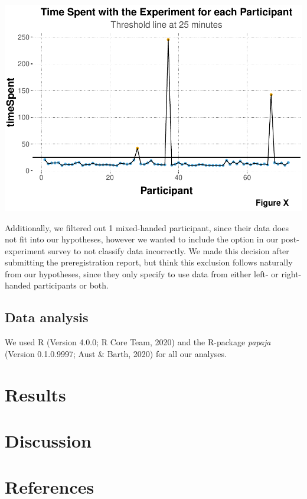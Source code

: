 \documentclass[
  english,
  man,floatsintext]{apa6}
\begin{document}
\includegraphics{APA_Template_files/figure-latex/unnamed-chunk-4-1.pdf}

Additionally, we filtered out 1 mixed-handed participant, since their data does not fit into our hypotheses, however we wanted to include the option in our post-experiment survey to not classify data incorrectly. We made this decision after submitting the preregistration report, but think this exclusion follows naturally from our hypotheses, since they only specify to use data from either left- or right-handed participants or both.

\hypertarget{data-analysis}{%
\subsection{Data analysis}\label{data-analysis}}

We used R (Version 4.0.0; R Core Team, 2020) and the R-package \emph{papaja} (Version 0.1.0.9997; Aust \& Barth, 2020) for all our analyses.

\hypertarget{results}{%
\section{Results}\label{results}}

\hypertarget{discussion}{%
\section{Discussion}\label{discussion}}

\newpage

\hypertarget{references}{%
\section{References}\label{references}}
\end{document}
